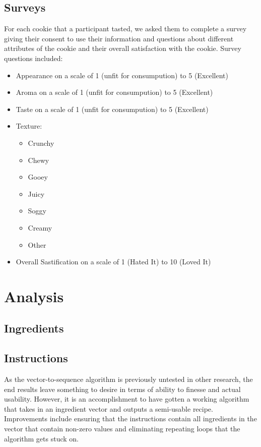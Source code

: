 \documentclass[11pt, a4paper]{article}
\begin{document}
		\subsection{Surveys}
		For each cookie that a participant tasted, we asked them to complete a survey giving their consent to use their information and questions about different attributes of the cookie and their overall satisfaction with the cookie.
		Survey questions included:
		\begin{itemize}
			\item Appearance  on a scale of 1 (unfit for consumpution) to 5 (Excellent) 
			\item Aroma on a scale of 1 (unfit for consumpution) to 5 (Excellent) 
			\item Taste on a scale of 1 (unfit for consumpution) to 5 (Excellent) 
			\item Texture:
			\begin{multicols}{2}
				\begin{itemize}
					\item Crunchy
					\item Chewy
					\item Gooey
					\item Juicy
					\item Soggy
					\item Creamy
					\item Other
				\end{itemize}
			\end{multicols}
		\item Overall Sastification on a scale of 1 (Hated It) to 10 (Loved It)
				
		\end{itemize}
		\section{Analysis}	
		\subsection{Ingredients}
		\subsection{Instructions}
		As the vector-to-sequence algorithm is previously untested in other research, the end results leave something to desire in terms of ability to finesse and actual usability. However, it is an accomplishment to have gotten a working algorithm that takes in an ingredient vector and outputs a semi-usable recipe. Improvements include ensuring that the instructions contain all ingredients in the vector that contain non-zero values and eliminating repeating loops that the algorithm gets stuck on.
\end{document}
